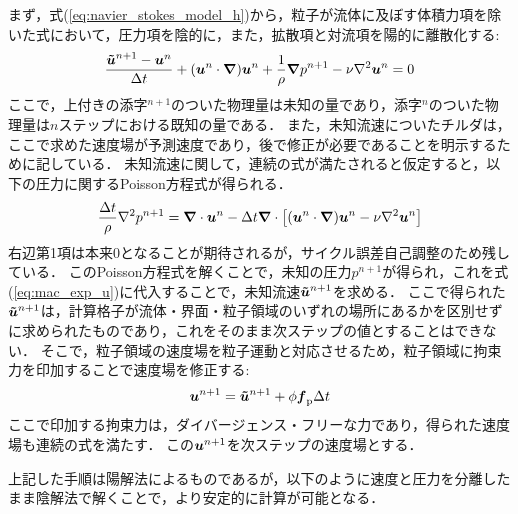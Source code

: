 \documentclass[pdflatex,a4paper,10pt,ja=standard]{bxjsarticle}
\def\vec#1{\mbox{\boldmath $#1$}}
\begin{document}
まず，式(\ref{eq:navier_stokes_model_h})から，粒子が流体に及ぼす体積力項を除いた式において，圧力項を陰的に，また，拡散項と対流項を陽的に離散化する:
\begin{align}
    \frac{\vec{\tilde{u}}^{n+1} - \vec{u}^{n}}{\Delta t} + (\vec{u}^{n} \cdot \vec{\nabla}) \vec{u}^{n} + \frac{1}{\rho}\vec{\nabla} p^{n+1} - \nu \nabla^2 \vec{u}^{n} = 0
    \label{eq:mac_exp_u}
\end{align}
ここで，上付きの添字${}^{n+1}$のついた物理量は未知の量であり，添字${}^{n}$のついた物理量は$n$ステップにおける既知の量である．
また，未知流速についたチルダは，ここで求めた速度場が予測速度であり，後で修正が必要であることを明示するために記している．
未知流速に関して，連続の式が満たされると仮定すると，以下の圧力に関するPoisson方程式が得られる．
\begin{align}
    \frac{\Delta t}{\rho} \nabla^2 p^{n+1} = \vec{\nabla} \cdot \vec{u}^{n} - \Delta t \vec{\nabla} \cdot \left[(\vec{u}^{n} \cdot \vec{\nabla}) \vec{u}^{n} - \nu \nabla^2 \vec{u}^{n}\right]
    \label{eq:mac_exp_p}
\end{align}
右辺第1項は本来$0$となることが期待されるが，サイクル誤差自己調整のため残している．
このPoisson方程式を解くことで，未知の圧力$p^{n+1}$が得られ，これを式(\ref{eq:mac_exp_u})に代入することで，未知流速$\vec{\tilde{u}}^{n+1}$を求める．
ここで得られた$\vec{\tilde{u}}^{n+1}$は，計算格子が流体・界面・粒子領域のいずれの場所にあるかを区別せずに求められたものであり，これをそのまま次ステップの値とすることはできない．
そこで，粒子領域の速度場を粒子運動と対応させるため，粒子領域に拘束力を印加することで速度場を修正する:
\begin{align}
    \vec{u}^{n+1} = \vec{\tilde{u}}^{n+1} + \phi \vec{f}_{\mathrm p} \Delta t
\end{align}
ここで印加する拘束力は，ダイバージェンス・フリーな力であり，得られた速度場も連続の式を満たす．
この$\vec{u}^{n+1}$を次ステップの速度場とする．

上記した手順は陽解法によるものであるが，以下のように速度と圧力を分離したまま陰解法で解くことで，より安定的に計算が可能となる\autocite{maruoka1998rheological}．
\end{document}
